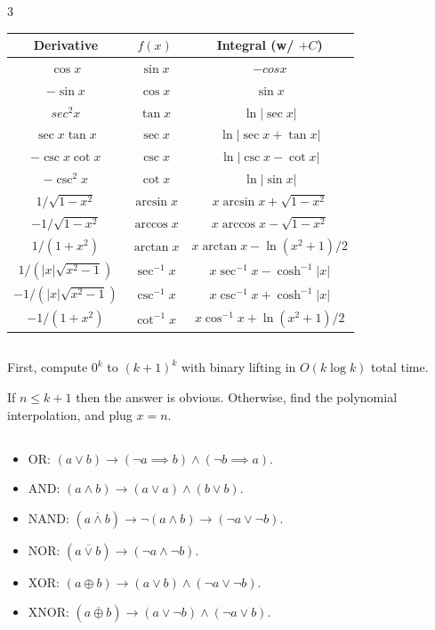 \documentclass[landscape, 8pt, a4paper, oneside]{extarticle}
\begin{document}
\begin{multicols*}{3}
\begin{center} \begin{tabular}{|c|c|c|} \hline
Derivative                  & $f(x)$        & Integral (w/ $+C$)               \\ \hline
$\cos x$                    & $\sin x$      & $-cos x$                         \\ \hline
$-\sin x$                   & $\cos x$      & $\sin x$                         \\ \hline
$sec^2 x$                   & $\tan x$      & $\ln |\sec x|$                   \\ \hline
$\sec x \tan x$             & $\sec x$      & $\ln|\sec x + \tan x|$           \\ \hline
$-\csc x \cot x$            & $\csc x$      & $\ln|\csc x - \cot x|$           \\ \hline
$-\csc^2 x$                 & $\cot x$      & $\ln |\sin x|$                   \\ \hline
$1 / \sqrt{1 - x^2}$        & $\arcsin x$   & $x \arcsin x + \sqrt{1 - x^2}$   \\ \hline
$-1 / \sqrt{1 - x^2}$       & $\arccos x$   & $x \arccos x - \sqrt{1 - x^2}$   \\ \hline
$1 / (1 + x^2)$             & $\arctan x$   & $x \arctan x - \ln(x^2 + 1)/2$   \\ \hline
$1 / (|x| \sqrt{x^2 - 1})$  & $\sec^{-1} x$ & $x \sec^{-1} x - \cosh^{-1} |x|$ \\ \hline
$-1 / (|x| \sqrt{x^2 - 1})$ & $\csc^{-1} x$ & $x \csc^{-1} x + \cosh^{-1} |x|$ \\ \hline
$-1 / (1 + x^2)$            & $\cot^{-1} x$ & $x \cos^{-1} x + \ln(x^2+1)/2$   \\ \hline
\end{tabular} \end{center}
\subsection{}
First, compute $0^k$ to $(k+1)^k$ with binary lifting in $O(k \log k)$ total time.

If $n \le k+1$ then the answer is obvious.
Otherwise, find the polynomial interpolation, and plug $x = n$.
\subsection{}
\begin{itemize}
	\item OR: $(a \vee b) \to (\neg a \implies b) \wedge (\neg b \implies a)$.
	\item AND: $(a \wedge b) \to (a \vee a) \wedge (b \vee b)$.
	\item NAND: $(a \overline{\wedge} b) \to \neg (a \wedge b) \to (\neg a \vee \neg b)$.
	\item NOR: $(a \overline{\vee} b) \to (\neg a \wedge \neg b)$.
	\item XOR: $(a \oplus b) \to (a \vee b) \wedge (\neg a \vee \neg b)$.
	\item XNOR: $(a \overline{\oplus} b) \to (a \vee \neg b) \wedge (\neg a \vee b)$.
\end{itemize}

\end{multicols*}
\end{document}
